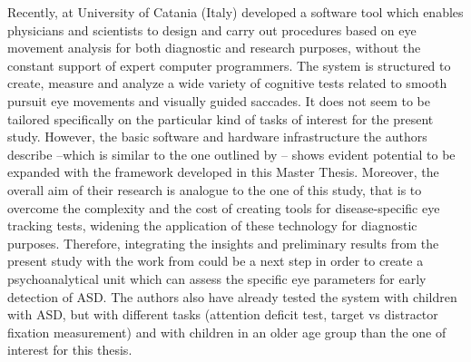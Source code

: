 Recently, \cite{giordano2017eyetrackersystem} at University of Catania (Italy) developed a software tool which enables physicians and scientists to design and carry out procedures based on eye movement analysis for both diagnostic and research purposes, without the constant support of expert computer programmers. The system is structured to create, measure and analyze a wide variety of cognitive tests related to smooth pursuit eye movements and visually guided saccades. It does not seem to be tailored specifically on the particular kind of tasks of interest for the present study. However, the basic software and hardware infrastructure the authors describe –which is similar to the one outlined by \cite{subrahmaniam2013animation}– shows evident potential to be expanded with the framework developed in this Master Thesis. Moreover, the overall aim of their research is analogue to the one of this study, that is to overcome the complexity and the cost of creating tools for disease-specific eye tracking tests, widening the application of these technology for diagnostic purposes. Therefore, integrating the insights and preliminary results from the present study with the work from \cite{giordano2017eyetrackersystem} could be a next step in order to create a psychoanalytical unit which can assess the specific eye parameters for early detection of ASD. The authors also have already tested the system with children with ASD, but with different tasks (attention deficit test, target vs distractor fixation measurement) and with children in an older age group than the one of interest for this thesis.
